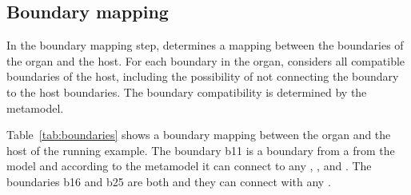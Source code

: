 \subsection{Boundary mapping}
In the boundary mapping step, \ApproachName{} determines a mapping between the boundaries of the organ and the host. For each boundary in the organ, \ApproachName{} considers all compatible boundaries of the host, including the possibility of not connecting the boundary to the host boundaries. The boundary compatibility is determined by the metamodel.

Table~\ref{tab:boundaries} shows a boundary mapping between the organ and the host of the running example. The boundary b11 is a boundary from a  from the model and according to the metamodel it can connect to any , , and . The boundaries b16 and b25 are both  and they can connect with any .

\begin{table}[tb]
\centering
{}
\caption{Mapping of compatible organ-host boundaries.}
\label{tab:boundaries}
\end{table}

